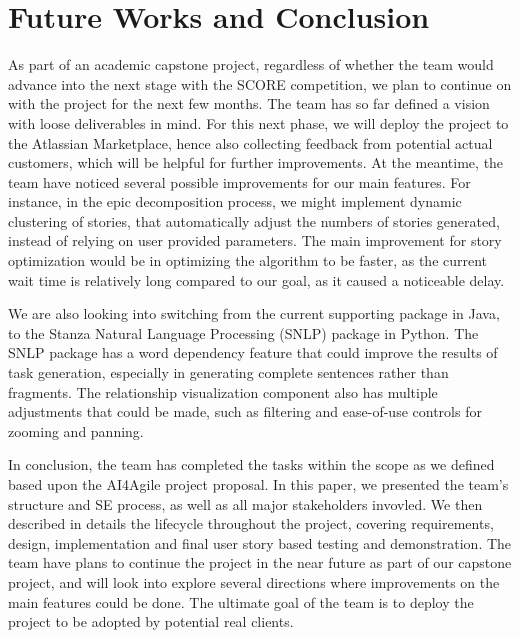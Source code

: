 \section{Future Works and Conclusion}
\label{conclusion}
As part of an academic capstone project, regardless of whether the team would advance into the next stage with the SCORE competition, we plan to continue on with the project for the next few months. The team has so far defined a vision with loose deliverables in mind. For this next phase, we will deploy the project to the Atlassian Marketplace, hence also collecting feedback from potential actual customers, which will be helpful for further improvements.  At the meantime, the team have noticed several possible improvements for our main features. For instance, in the epic decomposition process, we might implement dynamic clustering of stories, that automatically adjust the numbers of stories generated, instead of relying on user provided parameters. The main improvement for story optimization would be in optimizing the algorithm to be faster, as the current wait time is relatively long compared to our goal, as it caused a noticeable delay. 

We are also looking into switching from the current supporting package in Java, to the Stanza Natural Language Processing (SNLP) \cite{NLP1} package in Python. The SNLP package has a word dependency feature that could improve the results of task generation, especially in generating complete sentences rather than fragments. The relationship visualization component also has multiple adjustments that could be made, such as filtering and ease-of-use controls for zooming and panning. 

In conclusion, the team has completed the tasks within the scope as we defined based upon the AI4Agile project proposal. In this paper, we presented the team's structure and SE process, as well as all major stakeholders invovled. We then described in details the lifecycle throughout the project, covering requirements, design, implementation and final user story based testing and demonstration. The team have plans to continue the project in the near future as part of our capstone project, and will look into explore several directions where improvements on the main features could be done. The ultimate goal of the team is to deploy the project to be adopted by potential real clients. 